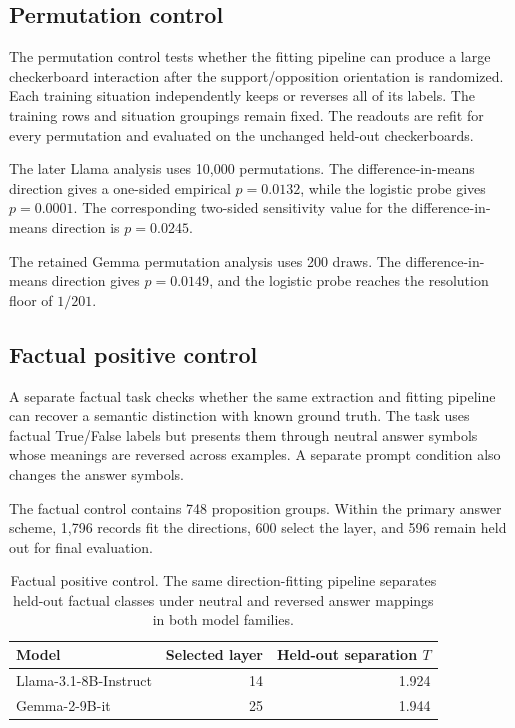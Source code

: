 \documentclass{article}
\begin{document}
\subsection{Permutation control}

The permutation control tests whether the fitting pipeline can produce a
large checkerboard interaction after the support/opposition orientation is
randomized. Each training situation independently keeps or reverses all of its
labels. The training rows and situation groupings remain fixed. The readouts
are refit for every permutation and evaluated on the unchanged held-out
checkerboards.

The later Llama analysis uses 10,000 permutations. The
difference-in-means direction gives a one-sided empirical
$p=0.0132$, while the logistic probe gives $p=0.0001$. The corresponding
two-sided sensitivity value for the difference-in-means direction is
$p=0.0245$.

The retained Gemma permutation analysis uses 200 draws. The
difference-in-means direction gives $p=0.0149$, and the logistic probe reaches
the resolution floor of $1/201$.

\subsection{Factual positive control}

A separate factual task checks whether the same extraction and fitting
pipeline can recover a semantic distinction with known ground truth. The task
uses factual True/False labels but presents them through neutral answer
symbols whose meanings are reversed across examples. A separate prompt
condition also changes the answer symbols.

The factual control contains 748 proposition groups. Within the primary answer
scheme, 1,796 records fit the directions, 600 select the layer, and 596 remain
held out for final evaluation.

\begin{table}[htbp]
\caption{Factual positive control.
The same direction-fitting pipeline separates held-out factual classes under
neutral and reversed answer mappings in both model families.}
\label{tab:factual-control}

\centering
\small
\begin{tabular}{lrr}
\toprule
Model & Selected layer & Held-out separation $T$ \\
\midrule
Llama-3.1-8B-Instruct & 14 & 1.924 \\
Gemma-2-9B-it & 25 & 1.944 \\
\bottomrule
\end{tabular}


\end{table}
\end{document}
